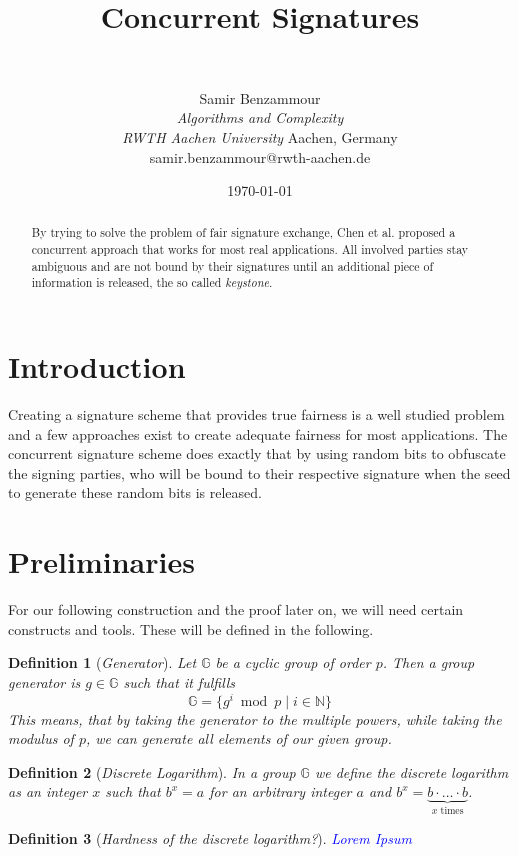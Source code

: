 \documentclass[final]{IEEEtran}%
\title{Concurrent Signatures}
\author{\IEEEauthorblockN{Samir Benzammour}\\
    \IEEEauthorblockA{\textit{Algorithms and Complexity} \\
    \textit{RWTH Aachen University}\\
    Aachen, Germany \\
    samir.benzammour@rwth-aachen.de}
  }
\author{Samir Benzammour\\
    \textit{Algorithms and Complexity}\\
    \textit{RWTH Aachen University}
    Aachen, Germany \\
    samir.benzammour@rwth-aachen.de
  }
\date{\today}
\newcommand{\nats}{\mathbb{N}}
\newcommand{\Set}[1]{\ensuremath{ \{ #1 \}}}
\newtheorem{definition}{\bfseries Definition}
\begin{document}
\maketitle

\begin{abstract}
  By trying to solve the problem of fair signature exchange, Chen et al. proposed a concurrent approach that works for most real applications. 
  All involved parties stay ambiguous and are not bound by their signatures until an additional piece of information is released, the so called \textit{keystone}.
\end{abstract}

\section{Introduction}
  Creating a signature scheme that provides true fairness is a well studied problem and a few approaches exist to create adequate fairness for most applications.
  The concurrent signature scheme does exactly that by using random bits to obfuscate the signing parties, who will be bound to their respective signature when the seed to generate these random bits is released.

\section{Preliminaries}
  For our following construction and the proof later on, we will need certain constructs and tools.
  These will be defined in the following.

  \begin{definition}[\textnormal{\textit{Generator}}]
    Let \(\mathbb{G}\) be a cyclic group of order \(p\). Then a group generator is \(g\in\mathbb{G}\) such that it fulfills
      \[\mathbb{G} = \Set{g^i \bmod p \mid i\in\nats}\]
    This means, that by taking the generator to the multiple powers, while taking the modulus of \(p\), we can generate all elements of our given group.
  \end{definition}

  \begin{definition}[\textnormal{\textit{Discrete Logarithm}}]
    In a group \(\mathbb{G}\) we define the \textit{discrete logarithm} as an integer \(x\) such that \(b^x = a\) for an arbitrary integer \(a\) and \(b^x = \underbrace{b\cdot \ldots\cdot b}_{x \text{ times}}\).
  \end{definition}

  \begin{definition}[\textnormal{\textit{Hardness of the discrete logarithm?}}]
    \textcolor{blue}{Lorem Ipsum}
  \end{definition}
\end{document}
